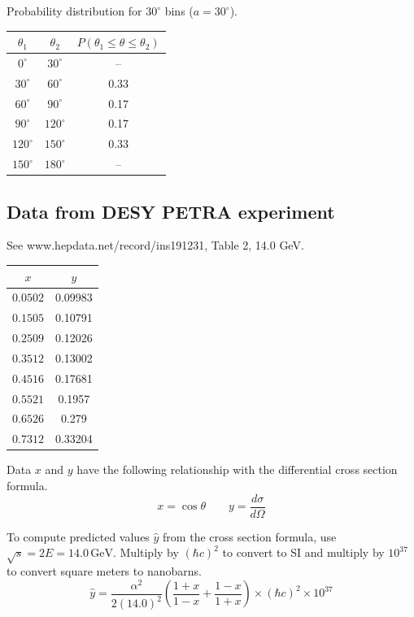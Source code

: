 \documentclass[12pt]{article}
\begin{document}
\noindent
Probability distribution for $30^\circ$ bins ($a=30^\circ$).

\begin{center}
\begin{tabular}{|c|c|c|}
\hline
$\theta_1$ & $\theta_2$ & $P(\theta_1\le\theta\le\theta_2)$\\
\hline
$0^\circ$ & $30^\circ$ & -- \\
$30^\circ$ & $60^\circ$ & 0.33 \\
$60^\circ$ & $90^\circ$ & 0.17 \\
$90^\circ$ & $120^\circ$ & 0.17 \\
$120^\circ$ & $150^\circ$ & 0.33 \\
$150^\circ$ & $180^\circ$ & -- \\
\hline
\end{tabular}
\end{center}

\subsection*{Data from DESY PETRA experiment}
\noindent
See www.hepdata.net/record/ins191231, Table 2, 14.0 GeV.

\begin{center}
\begin{tabular}{|c|c|}
\hline
$x$ & $y$\\
\hline
$0.0502$ & 0.09983\\
$0.1505$ & 0.10791\\
$0.2509$ & 0.12026\\
$0.3512$ & 0.13002\\
$0.4516$ & 0.17681\\
$0.5521$ & 0.1957\phantom{0}\\
$0.6526$ & 0.279\phantom{00}\\
$0.7312$ & 0.33204\\
\hline
\end{tabular}
\end{center}

\noindent
Data $x$ and $y$ have the following relationship
with the differential cross section formula.
\begin{equation*}
x=\cos\theta
\qquad
y=\frac{d\sigma}{d\Omega}
\end{equation*}

\noindent
To compute predicted values $\hat{y}$ from the cross section formula,
use $\sqrt{s}=2E=14.0\,\text{GeV}$.
Multiply by $(\hbar c)^2$ to convert to SI
and multiply by $10^{37}$ to convert square meters to nanobarns.
\begin{equation*}
\hat{y}
=
\frac{\alpha^2}{2(14.0)^2}
\left(
\frac{1+x}{1-x}+
\frac{1-x}{1+x}
\right)
\times(\hbar c)^2
\times10^{37}
\end{equation*}
\end{document}
